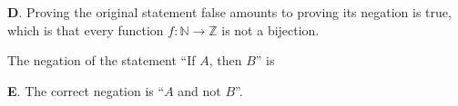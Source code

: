 \documentclass[addpoints]{exam}
\begin{document}
\begin{questions}

\begin{solution}
	\textbf{D}. Proving the original statement false amounts to proving its negation is true, which is that every function $f: \mathbb{N} \to \mathbb{Z}$ is not a bijection. 
\end{solution}

\question[2] The negation of the statement ``If $A$, then $B$'' is

\begin{solution}
	\textbf{E}. The correct negation is ``$A$ and not $B$''.
\end{solution}



\end{questions}
\end{document}
